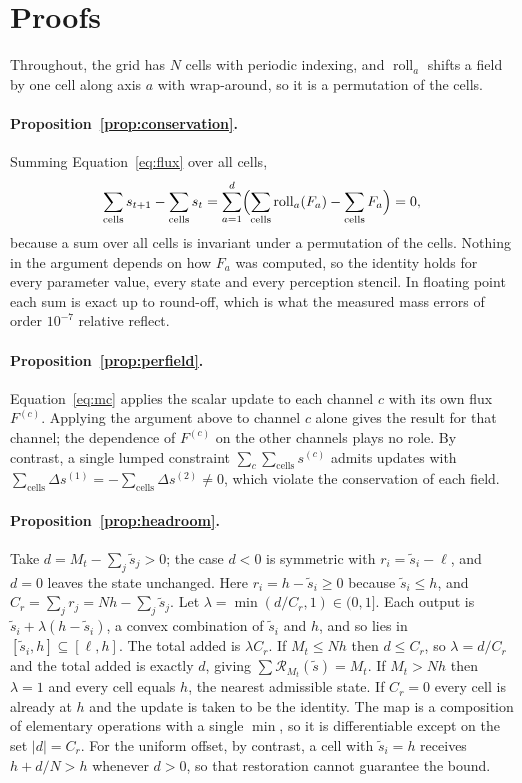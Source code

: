 \section{Proofs}
\label{sec:proofs}
Throughout, the grid has $N$ cells with periodic indexing, and $\operatorname{roll}_a$
shifts a field by one cell along axis $a$ with wrap-around, so it is a permutation of the
cells.

\paragraph{Proposition~\ref{prop:conservation}.} Summing Equation~\ref{eq:flux} over all
cells,
\begin{equation}
 \sum_{\mathrm{cells}}s_{t+1}-\sum_{\mathrm{cells}}s_t
 =\sum_{a=1}^{d}\Bigl(\sum_{\mathrm{cells}}\operatorname{roll}_a(F_a)
 -\sum_{\mathrm{cells}}F_a\Bigr)=0,
\end{equation}
because a sum over all cells is invariant under a permutation of the cells. Nothing in
the argument depends on how $F_a$ was computed, so the identity holds for every parameter
value, every state and every perception stencil. In floating point each sum is exact up to round-off, which is what the
measured mass errors of order $10^{-7}$ relative reflect.

\paragraph{Proposition~\ref{prop:perfield}.} Equation~\ref{eq:mc} applies the scalar
update to each channel $c$ with its own flux $F^{(c)}$. Applying the argument above to
channel $c$ alone gives the result for that channel; the dependence of $F^{(c)}$ on the
other channels plays no role. By contrast, a single lumped constraint
$\sum_c\sum_{\mathrm{cells}}s^{(c)}$ admits updates with
$\sum_{\mathrm{cells}}\Delta s^{(1)}=-\sum_{\mathrm{cells}}\Delta s^{(2)}\neq0$, which
violate the conservation of each field.

\paragraph{Proposition~\ref{prop:headroom}.} Take $d=M_t-\sum_j\widetilde s_j>0$; the case
$d<0$ is symmetric with $r_i=\widetilde s_i-\ell$, and $d=0$ leaves the state unchanged.
Here $r_i=h-\widetilde s_i\ge0$ because $\widetilde s_i\le h$, and
$C_r=\sum_jr_j=Nh-\sum_j\widetilde s_j$. Let $\lambda=\min(d/C_r,1)\in(0,1]$. Each output
is $\widetilde s_i+\lambda(h-\widetilde s_i)$, a convex combination of $\widetilde s_i$
and $h$, and so lies in $[\widetilde s_i,h]\subseteq[\ell,h]$. The total added is
$\lambda C_r$. If $M_t\le Nh$ then $d\le C_r$, so $\lambda=d/C_r$ and the total added is
exactly $d$, giving $\sum\mathcal{R}_{M_t}(\widetilde s)=M_t$. If $M_t>Nh$ then
$\lambda=1$ and every cell equals $h$, the nearest admissible state. If $C_r=0$ every cell
is already at $h$ and the update is taken to be the identity. The map is a composition of
elementary operations with a single $\min$, so it is differentiable except on the set
$|d|=C_r$. For the uniform offset, by contrast, a cell with $\widetilde s_i=h$ receives
$h+d/N>h$ whenever $d>0$, so that restoration cannot guarantee the bound.

